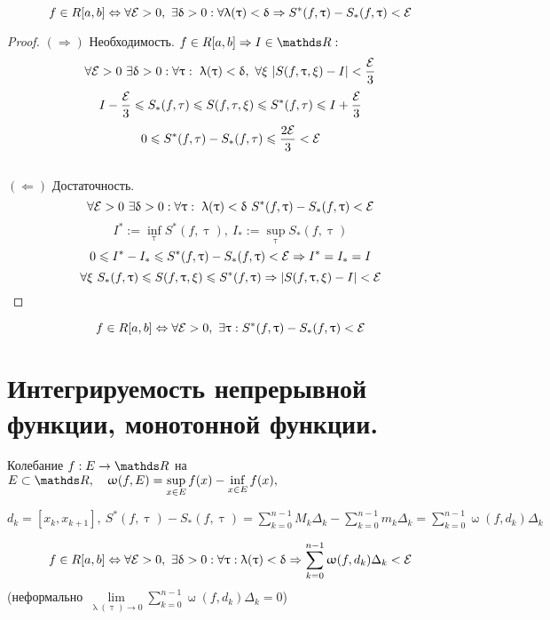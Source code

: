 \documentclass[11pt, fleqn]{article}
\begin{document}
\begin{Theorem} 
    \[f \in R[a,b] \Leftrightarrow \forall \mathcal{E} > 0,\ \exists \updelta > 0: \forall \uplambda(\uptau) < \updelta \Rightarrow S^*(f, \uptau)-S_*(f, \uptau)<\mathcal{E}\]
\end{Theorem}

\begin{proof}
    $(\Rightarrow)$ Необходимость. $f \in R[a,b] \Rightarrow I \in \R:$
    $$\forall \mathcal{E} > 0\ \exists \updelta > 0: \forall \uptau: \ \uplambda(\uptau) < \updelta,\ \forall \xi \ |S(f, \uptau, \xi) - I| < \frac{\mathcal{E}}{3}$$
    $$I-\frac{\mathcal{E}}{3} \leqslant S_*(f, \tau) \leqslant  S(f, \tau, \xi) \leqslant S^*(f, \tau) \leqslant  I+\frac{\mathcal{E}}{3}$$
    $$0 \leqslant S^*(f, \tau) - S_*(f, \tau) \leqslant \frac{2 \mathcal{E}}{3} < \mathcal{E}$$
    \\
    $(\Leftarrow)$ Достаточность. 
    $$\forall \E > 0\ \e \updelta > 0: \forall \uptau: \ \uplambda(\uptau) < \updelta\ S^*(f, \uptau)-S_*(f,\uptau) < \E$$
    $$I^*:=\inf\limits_\uptau S^*(f, \uptau), \ I_*:=\sup\limits_\uptau S_* (f, \uptau)$$
    $$0 \leqslant I^* - I_* \leqslant S^*(f, \uptau) - S_*(f, \uptau) < \mathcal{E} \Rightarrow I^*=I_*=I$$
    $$\forall \xi \ S_*(f, \uptau) \leqslant S(f, \uptau, \xi) \leqslant S^*(f, \uptau) \Rightarrow |S(f, \uptau, \xi) - I| < \mathcal{E}$$
\end{proof}

\begin{Theorem} 
    \[f \in R[a,b] \Leftrightarrow \forall \mathcal{E} > 0,\ \exists \uptau: S^*(f, \uptau)-S_*(f, \uptau) < \mathcal{E}\]
\end{Theorem}

\newpage
\section{Интегрируемость непрерывной функции, монотонной функции.}

\begin{definition}
    Колебание $f: E \rightarrow \R$ на $E \subset \R, \q \upomega(f, E)=\sup\limits_{x \in E} f(x) - \inf\limits_{x \in E} f(x),$ 
    
    $d_k=[x_k, x_{k+1}],\ S^*(f,\uptau)-S_*(f,\uptau)=\sum\limits_{k=0}^{n-1} M_k \Delta_k - \sum\limits_{k=0}^{n-1} m_k \Delta_k = \sum\limits_{k=0}^{n-1} \upomega(f, d_k) \Delta_k$
\end{definition}

\begin{Theorem} 
    \[f \in R [a,b] \lra \forall \E > 0,\ \e \updelta > 0: \forall \uptau: \uplambda(\uptau) < \updelta \Ra \sum\limits_{k=0}^{n-1} \upomega(f, d_k) \Delta_k < \E\]
    (неформально $\lim\limits_{\uplambda(\uptau) \rightarrow 0} \sum\limits_{k=0}^{n-1} \upomega(f,d_k) \Delta_k=0$)
\end{Theorem}
\end{document}
